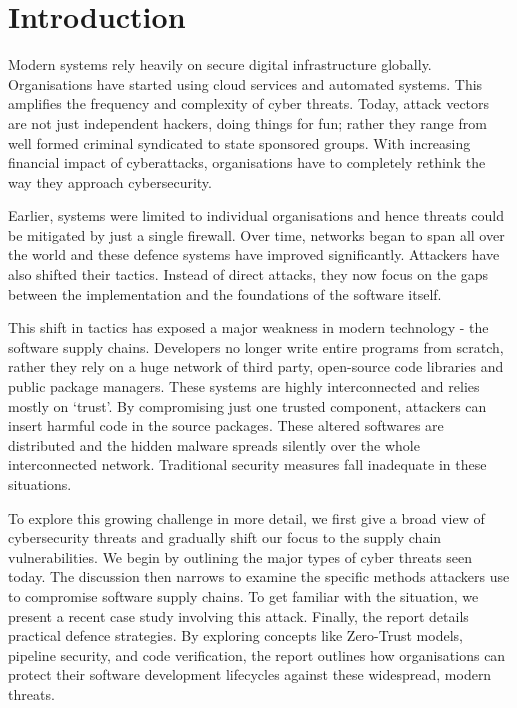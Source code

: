 \mainmatter %
\pagestyle{thesis} %

\chapter{Introduction}
\label{ch:introduction}

Modern systems rely heavily on secure digital infrastructure globally. Organisations have started using cloud services and automated systems. This amplifies the frequency and complexity of cyber threats. Today, attack vectors are not just independent hackers, doing things for fun; rather they range from well formed criminal syndicated to state sponsored groups. With increasing financial impact of cyberattacks, organisations have to completely rethink the way they approach cybersecurity.

Earlier, systems were limited to individual organisations and hence threats could be mitigated by just a single firewall. Over time, networks began to span all over the world and these defence systems have improved significantly. Attackers have also shifted their tactics. Instead of direct attacks, they now focus on the gaps between the implementation and the foundations of the software itself.

This shift in tactics has exposed a major weakness in modern technology - the software supply chains. Developers no longer write entire programs from scratch, rather they rely on a huge network of third party, open-source code libraries and public package managers. These systems are highly interconnected and relies mostly on ‘trust’. By compromising just one trusted component, attackers can insert harmful code in the source packages. These altered softwares are distributed and the hidden malware spreads silently over the whole interconnected network. Traditional security measures fall inadequate in these situations.

To explore this growing challenge in more detail, we first give a broad view of cybersecurity threats and gradually shift our focus to the supply chain vulnerabilities. We begin by outlining the major types of cyber threats seen today. The discussion then narrows to examine the specific methods attackers use to compromise software supply chains. To get familiar with the situation, we present a recent case study involving this attack. Finally, the report details practical defence strategies. By exploring concepts like Zero-Trust models, pipeline security, and code verification, the report outlines how organisations can protect their software development lifecycles against these widespread, modern threats.


